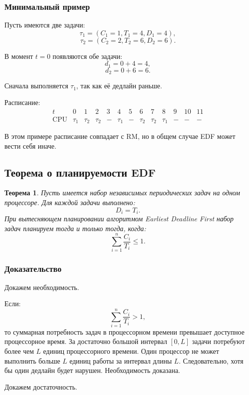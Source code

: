 \documentclass[12pt,a4paper]{article}
\newtheorem{theorem}{Теорема}
\begin{document}
\subsubsection{Минимальный пример}

Пусть имеются две задачи:
\[
    \tau_1 = (C_1 = 1, T_1 = 4, D_1 = 4),
\]
\[
    \tau_2 = (C_2 = 2, T_2 = 6, D_2 = 6).
\]

В момент $t=0$ появляются обе задачи:
\[
    d_1 = 0 + 4 = 4,
\]
\[
    d_2 = 0 + 6 = 6.
\]

Сначала выполняется $\tau_1$, так как её дедлайн раньше.

Расписание:
\[
\begin{array}{c|cccccccccccc}
t        & 0 & 1 & 2 & 3 & 4 & 5 & 6 & 7 & 8 & 9 & 10 & 11 \\
\hline
\text{CPU} & \tau_1 & \tau_2 & \tau_2 & - & \tau_1 & - & \tau_2 & \tau_2 & \tau_1 & - & - & -
\end{array}
\]

В этом примере расписание совпадает с RM, но в общем случае EDF может вести себя иначе.

\subsection{Теорема о планируемости EDF}

\begin{theorem}
Пусть имеется набор независимых периодических задач на одном процессоре. Для каждой задачи выполнено:
\[
    D_i = T_i.
\]
При вытесняющем планировании алгоритмом Earliest Deadline First набор задач планируем тогда и только тогда, когда:
\[
    \sum_{i=1}^{n} \frac{C_i}{T_i} \leq 1.
\]
\end{theorem}

\subsubsection{Доказательство}

Докажем необходимость.

Если:
\[
    \sum_{i=1}^{n} \frac{C_i}{T_i} > 1,
\]
то суммарная потребность задач в процессорном времени превышает доступное процессорное время. За достаточно большой интервал $[0,L]$ задачи потребуют более чем $L$ единиц процессорного времени. Один процессор не может выполнить больше $L$ единиц работы за интервал длины $L$. Следовательно, хотя бы один дедлайн будет нарушен. Необходимость доказана.

Докажем достаточность.
\end{document}
